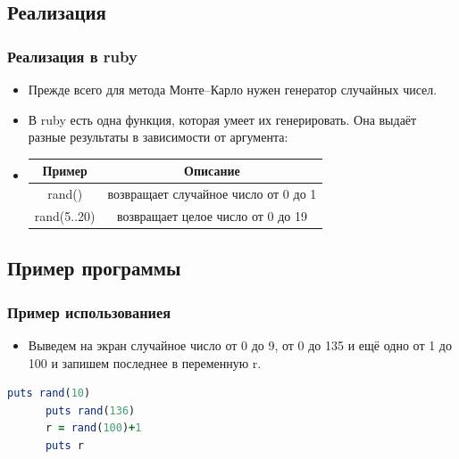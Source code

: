 \documentclass[compress,red]{beamer}
\begin{document}
\subsection{Реализация}
\begin{frame}[fragile]
  \frametitle{Реализация в ruby}
  \begin{itemize}
    \item Прежде всего для метода Монте--Карло нужен генератор случайных чисел. 
    \item В ruby есть одна функция, которая умеет их генерировать. Она выдаёт разные результаты в зависимости от аргумента:
    \item
    \begin{tabular}{|c|c|}
      \hline
      Пример & Описание \\
      \hline
      rand() & возвращает случайное число от 0 до 1 \\
      \hline
      rand(5..20) & возвращает целое число от 0 до 19 \\
      \hline
    \end{tabular}
  \end{itemize}
\end{frame}

\subsection{Пример программы}
\begin{frame}[fragile]
  \frametitle{Пример использованиея}
  
  \begin{itemize}
    \item Выведем на экран случайное число от 0 до 9, от 0 до 135 и ещё одно от 1 до 100 и запишем последнее в переменную r.
  \end{itemize}
    \begin{lstlisting}[language=ruby,basicstyle=\footnotesize,label=ruby1,caption=Случайные числа]
      puts rand(10)
      puts rand(136)
      r = rand(100)+1
      puts r
    \end{lstlisting}
\end{frame}
\end{document}
